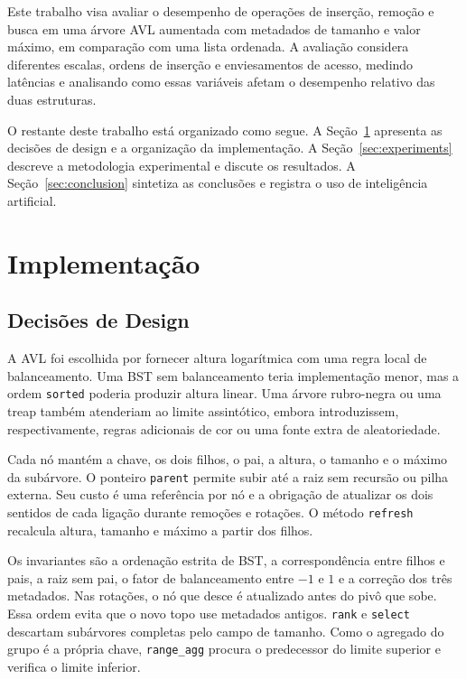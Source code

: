 \documentclass[12pt]{article}
\begin{document}
{Este trabalho visa avaliar o desempenho de operações de inserção, remoção e busca em uma árvore AVL aumentada com metadados de tamanho e valor máximo, em comparação com uma lista ordenada. A avaliação considera diferentes escalas, ordens de inserção e enviesamentos de acesso, medindo latências e analisando como essas variáveis afetam o desempenho relativo das duas estruturas.}

{O restante deste trabalho está organizado como segue. A Seção~\ref{sec:implementation} apresenta as decisões de design e a organização da implementação. A Seção~\ref{sec:experiments} descreve a metodologia experimental e discute os resultados. A Seção~\ref{sec:conclusion} sintetiza as conclusões e registra o uso de inteligência artificial.}

\section{Implementação}\label{sec:implementation}

\subsection{{Decisões de Design}}\label{sec:implementation:design}

{A AVL foi escolhida por fornecer altura logarítmica com uma regra local de balanceamento. Uma BST sem balanceamento teria implementação menor, mas a ordem \texttt{sorted} poderia produzir altura linear. Uma árvore rubro-negra ou uma treap também atenderiam ao limite assintótico, embora introduzissem, respectivamente, regras adicionais de cor ou uma fonte extra de aleatoriedade.}

{Cada nó mantém a chave, os dois filhos, o pai, a altura, o tamanho e o máximo da subárvore. O ponteiro \texttt{parent} permite subir até a raiz sem recursão ou pilha externa. Seu custo é uma referência por nó e a obrigação de atualizar os dois sentidos de cada ligação durante remoções e rotações. O método \texttt{refresh} recalcula altura, tamanho e máximo a partir dos filhos.}

{Os invariantes são a ordenação estrita de BST, a correspondência entre filhos e pais, a raiz sem pai, o fator de balanceamento entre $-1$ e $1$ e a correção dos três metadados. Nas rotações, o nó que desce é atualizado antes do pivô que sobe. Essa ordem evita que o novo topo use metadados antigos. \texttt{rank} e \texttt{select} descartam subárvores completas pelo campo de tamanho. Como o agregado do grupo é a própria chave, \texttt{range\_agg} procura o predecessor do limite superior e verifica o limite inferior.}
\end{document}
